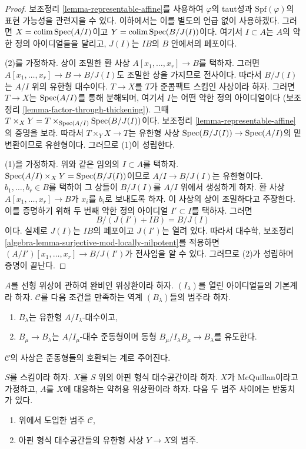 \begin{proof}
보조정리 \ref{lemma-representable-affine}를 사용하여 $\varphi$의 taut성과
$\text{Spf}(\varphi)$의 표현 가능성을 관련지을 수 있다. 이하에서는 이를
별도의 언급 없이 사용하겠다. 그러면
$X = \mathop{\mathrm{colim}}\nolimits \mathop{\mathrm{Spec}}(A/I)$이고 $Y = \mathop{\mathrm{colim}}\nolimits \mathop{\mathrm{Spec}}(B/J(I))$이다. 여기서
$I \subset A$는 $A$의 약한 정의 아이디얼들을 달리고, $J(I)$는
$IB$의 $B$ 안에서의 폐포이다.

\medskip\noindent
(2)를 가정하자. 상이 조밀한 환 사상
$A[x_1, \ldots, x_r] \to B$를 택하자. 그러면
$A[x_1, \ldots, x_r] \to B \to B/J(I)$도 조밀한 상을 가지므로
전사이다. 따라서 $B/J(I)$는 $A/I$ 위의 유한형 대수이다.
$T \to X$를 $T$가 준콤팩트 스킴인 사상이라 하자. 그러면
$T \to X$는 $\mathop{\mathrm{Spec}}(A/I)$를 통해 분해되며, 여기서 $I$는 어떤 약한
정의 아이디얼이다
(보조정리 \ref{lemma-factor-through-thickening}). 그때
$T \times_X Y = T \times_{\mathop{\mathrm{Spec}}(A/I)} \mathop{\mathrm{Spec}}(B/J(I))$이다. 보조정리
\ref{lemma-representable-affine}의 증명을 보라. 따라서
$T \times_Y X \to T$는 유한형 사상
$\mathop{\mathrm{Spec}}(B/J(I)) \to \mathop{\mathrm{Spec}}(A/I)$의 밑변환이므로 유한형이다. %
그러므로 (1)이 성립한다.

\medskip\noindent
(1)을 가정하자. 위와 같은 임의의 $I \subset A$를 택하자.
$\mathop{\mathrm{Spec}}(A/I) \times_X Y = \mathop{\mathrm{Spec}}(B/J(I))$이므로
$A/I \to B/J(I)$는 유한형이다. $b_1, \ldots, b_r \in B$를 택하여
그 상들이 $B/J(I)$를 $A/I$ 위에서 생성하게 하자. 환 사상
$A[x_1, \ldots, x_r] \to B$가 $x_i$를 $b_i$로 보내도록 하자.
이 사상의 상이 조밀하다고 주장한다. 이를 증명하기 위해 두 번째 약한 정의 아이디얼
$I' \subset I$를 택하자. 그러면
$$
B/(J(I') + IB) = B/J(I)
$$
이다. 실제로 $J(I)$는 $IB$의 폐포이고 $J(I')$는 열려 있다.
따라서 대수학, 보조정리
\ref{algebra-lemma-surjective-mod-locally-nilpotent}를 적용하면
$(A/I')[x_1, \ldots, x_r] \to B/J(I')$가 전사임을 알 수 있다.
그러므로 (2)가 성립하며 증명이 끝난다.
\end{proof}

\noindent
$A$를 선형 위상에 관하여 완비인 위상환이라 하자.
$(I_\lambda)$를 열린 아이디얼들의 기본계라 하자. $\mathcal{C}$를
다음 조건을 만족하는 역계 $(B_\lambda)$들의 범주라 하자.
\begin{enumerate}
\item $B_\lambda$는 유한형 $A/I_\lambda$-대수이고,
\item $B_\mu \to B_\lambda$는 $A/I_\mu$-대수 준동형이며
동형 $B_\mu/I_\lambda B_\mu \to B_\lambda$를 유도한다.
\end{enumerate}
$\mathcal{C}$의 사상은 준동형들의 호환되는 계로 주어진다.

\begin{lemma}
\label{lemma-category-affine-over}
$S$를 스킴이라 하자. $X$를 $S$ 위의 아핀 형식 대수공간이라 하자.
$X$가 McQuillan이라고 가정하고, $A$를 $X$에 대응하는 약허용
위상환이라 하자. 다음 두 범주 사이에는 반동치가 있다.
\begin{enumerate}
\item 위에서 도입한 범주 $\mathcal{C}$,
\item 아핀 형식 대수공간들의 유한형 사상 $Y \to X$의 범주.
\end{enumerate}
\end{lemma}

